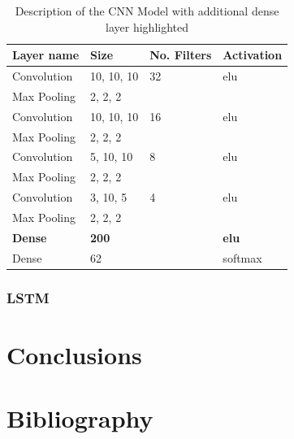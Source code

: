 \documentclass[12pt]{article}
\theoremstyle{definition}
\begin{document}
	\begin{table}[h]
		\centering
		\renewcommand{\arraystretch}{1.5}

		\caption{Description of the CNN Model with additional dense layer highlighted}
		\label{table:dense-CNN}

		\begin{tabularx}{\textwidth}{XXXX}
			\textbf{Layer name} & \textbf{Size} & \textbf{No. Filters} & \textbf{Activation} \\ \hline
			Convolution    & 10, 10, 10   & 32                   & elu                  \\ \hline
			Max Pooling    & 2, 2, 2      & \textbf{\textendash} & \textbf{\textendash} \\ \hline
			Convolution    & 10, 10, 10   & 16                   & elu                  \\ \hline
			Max Pooling    & 2, 2, 2      & \textbf{\textendash} & \textbf{\textendash} \\ \hline
			Convolution    & 5, 10, 10    & 8                    & elu                  \\ \hline
			Max Pooling    & 2, 2, 2      & \textbf{\textendash} & \textbf{\textendash} \\ \hline
			Convolution    & 3, 10, 5     & 4                    & elu                  \\ \hline
			Max Pooling    & 2, 2, 2      & \textbf{\textendash} & \textbf{\textendash} \\ \hline
			\rowcolor{Gray}
			\textbf{Dense} & \textbf{200} & \textbf{\textendash} & \textbf{elu}         \\ \hline
			Dense          & 62           & \textbf{\textendash} & softmax              \\
		\end{tabularx}
	\end{table}

	\subsubsection{LSTM}



	\newpage

	\section{Conclusions}
	\vspace{1cm}

	\newpage

	\section{Bibliography}
	
	
\end{document}
